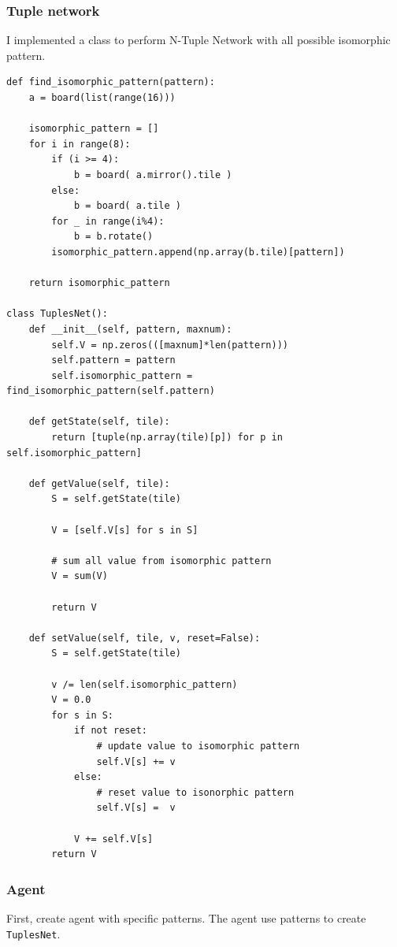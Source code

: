 \documentclass[12pt]{article}
\begin{document}
\subsubsection{Tuple network}

I implemented a class to perform N-Tuple Network with all possible isomorphic pattern.

\begin{verbatim}
def find_isomorphic_pattern(pattern):
    a = board(list(range(16)))

    isomorphic_pattern = []
    for i in range(8):
        if (i >= 4):
            b = board( a.mirror().tile )
        else:
            b = board( a.tile )
        for _ in range(i%4):
            b = b.rotate()
        isomorphic_pattern.append(np.array(b.tile)[pattern])
        
    return isomorphic_pattern

class TuplesNet():
    def __init__(self, pattern, maxnum):
        self.V = np.zeros(([maxnum]*len(pattern)))
        self.pattern = pattern
        self.isomorphic_pattern = find_isomorphic_pattern(self.pattern)
        
    def getState(self, tile):
        return [tuple(np.array(tile)[p]) for p in self.isomorphic_pattern]
    
    def getValue(self, tile):
        S = self.getState(tile)
        
        V = [self.V[s] for s in S]
        
        # sum all value from isomorphic pattern
        V = sum(V)

        return V
    
    def setValue(self, tile, v, reset=False):
        S = self.getState(tile)

        v /= len(self.isomorphic_pattern)
        V = 0.0
        for s in S:
            if not reset:
                # update value to isomorphic pattern
                self.V[s] += v
            else:
                # reset value to isonorphic pattern
                self.V[s] =  v
                
            V += self.V[s]
        return V
\end{verbatim}

\subsubsection{Agent}

First, create agent with specific patterns. The agent use patterns to create \verb|TuplesNet|.
\end{document}
